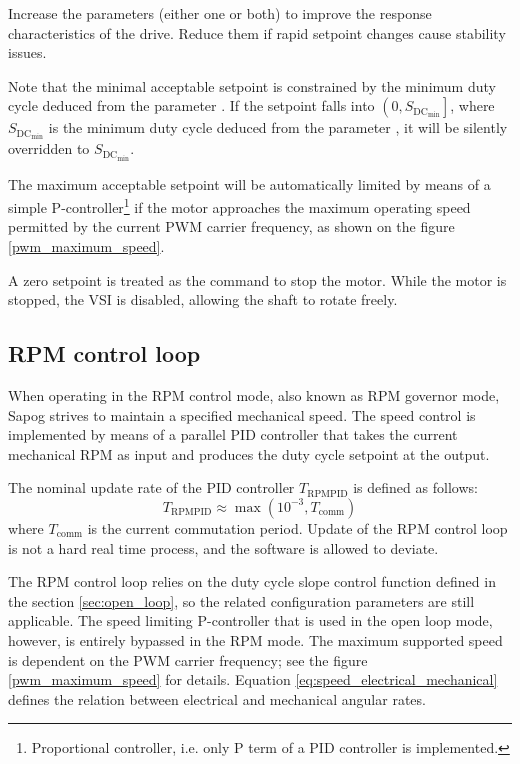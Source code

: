 \documentclass{zubaxdoc}
\begin{document}
Increase the parameters (either one or both) to improve the response characteristics of the drive.
Reduce them if rapid setpoint changes cause stability issues.

Note that the minimal acceptable setpoint is constrained by the minimum duty cycle deduced from
the parameter .
If the setpoint falls into $\left(0, S_{\text{DC}_\text{min}}\right]$,
where $S_{\text{DC}_\text{min}}$ is the minimum
duty cycle deduced from the parameter ,
it will be silently overridden to $S_{\text{DC}_\text{min}}$.

The maximum acceptable setpoint will be automatically limited by means of a simple
P-controller\footnote{Proportional controller, i.e. only P term of a PID controller is implemented.}
if the motor approaches the maximum operating speed permitted by the
current PWM carrier frequency, as shown on the figure \ref{pwm_maximum_speed}.

A zero setpoint is treated as the command to stop the motor.
While the motor is stopped, the VSI is disabled, allowing the shaft to rotate freely.

\subsection{RPM control loop}\label{sec:rpm_loop}

When operating in the RPM control mode, also known as RPM governor mode,
Sapog strives to maintain a specified mechanical speed.
The speed control is implemented by means of a parallel PID controller
that takes the current mechanical RPM as input and
produces the duty cycle setpoint at the output.

The nominal update rate of the PID controller $T_{\text{RPMPID}}$ is defined as follows:
\begin{equation}\label{eq:rpm_pid_control_loop_period}
T_{\text{RPMPID}} \approx \max \left(10^{-3},T_{\text{comm}}\right)
\end{equation}
where $T_\text{comm}$ is the current commutation period.
Update of the RPM control loop is not a hard real time process, and the software is allowed to
deviate.

The RPM control loop relies on the duty cycle slope control function defined in the section
\ref{sec:open_loop}, so the related configuration parameters are still applicable.
The speed limiting P-controller that is used in the open loop mode, however,
is entirely bypassed in the RPM mode.
The maximum supported speed is dependent on the PWM carrier frequency;
see the figure \ref{pwm_maximum_speed} for details.
Equation \ref{eq:speed_electrical_mechanical} defines the relation between electrical
and mechanical angular rates.
\end{document}
